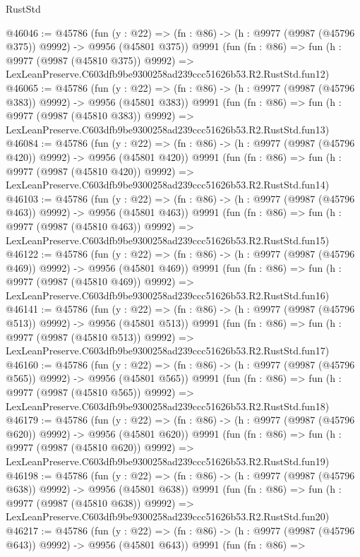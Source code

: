 \begin{lexlean}{RustStd}
\begin{coremodule}
@46046 := @45786
    (fun (y : @22) => (fn : @86) -> (h : @9977 (@9987 (@45796 @375)) @9992) -> @9956 (@45801 @375))
    @9991
    (fun (fn : @86) =>
    fun (h : @9977 (@9987 (@45810 @375)) @9992) =>
    LexLeanPreserve.C603dfb9be9300258ad239ccc51626b53.R2.RustStd.fun12)
@46065 := @45786
    (fun (y : @22) => (fn : @86) -> (h : @9977 (@9987 (@45796 @383)) @9992) -> @9956 (@45801 @383))
    @9991
    (fun (fn : @86) =>
    fun (h : @9977 (@9987 (@45810 @383)) @9992) =>
    LexLeanPreserve.C603dfb9be9300258ad239ccc51626b53.R2.RustStd.fun13)
@46084 := @45786
    (fun (y : @22) => (fn : @86) -> (h : @9977 (@9987 (@45796 @420)) @9992) -> @9956 (@45801 @420))
    @9991
    (fun (fn : @86) =>
    fun (h : @9977 (@9987 (@45810 @420)) @9992) =>
    LexLeanPreserve.C603dfb9be9300258ad239ccc51626b53.R2.RustStd.fun14)
@46103 := @45786
    (fun (y : @22) => (fn : @86) -> (h : @9977 (@9987 (@45796 @463)) @9992) -> @9956 (@45801 @463))
    @9991
    (fun (fn : @86) =>
    fun (h : @9977 (@9987 (@45810 @463)) @9992) =>
    LexLeanPreserve.C603dfb9be9300258ad239ccc51626b53.R2.RustStd.fun15)
@46122 := @45786
    (fun (y : @22) => (fn : @86) -> (h : @9977 (@9987 (@45796 @469)) @9992) -> @9956 (@45801 @469))
    @9991
    (fun (fn : @86) =>
    fun (h : @9977 (@9987 (@45810 @469)) @9992) =>
    LexLeanPreserve.C603dfb9be9300258ad239ccc51626b53.R2.RustStd.fun16)
@46141 := @45786
    (fun (y : @22) => (fn : @86) -> (h : @9977 (@9987 (@45796 @513)) @9992) -> @9956 (@45801 @513))
    @9991
    (fun (fn : @86) =>
    fun (h : @9977 (@9987 (@45810 @513)) @9992) =>
    LexLeanPreserve.C603dfb9be9300258ad239ccc51626b53.R2.RustStd.fun17)
@46160 := @45786
    (fun (y : @22) => (fn : @86) -> (h : @9977 (@9987 (@45796 @565)) @9992) -> @9956 (@45801 @565))
    @9991
    (fun (fn : @86) =>
    fun (h : @9977 (@9987 (@45810 @565)) @9992) =>
    LexLeanPreserve.C603dfb9be9300258ad239ccc51626b53.R2.RustStd.fun18)
@46179 := @45786
    (fun (y : @22) => (fn : @86) -> (h : @9977 (@9987 (@45796 @620)) @9992) -> @9956 (@45801 @620))
    @9991
    (fun (fn : @86) =>
    fun (h : @9977 (@9987 (@45810 @620)) @9992) =>
    LexLeanPreserve.C603dfb9be9300258ad239ccc51626b53.R2.RustStd.fun19)
@46198 := @45786
    (fun (y : @22) => (fn : @86) -> (h : @9977 (@9987 (@45796 @638)) @9992) -> @9956 (@45801 @638))
    @9991
    (fun (fn : @86) =>
    fun (h : @9977 (@9987 (@45810 @638)) @9992) =>
    LexLeanPreserve.C603dfb9be9300258ad239ccc51626b53.R2.RustStd.fun20)
@46217 := @45786
    (fun (y : @22) => (fn : @86) -> (h : @9977 (@9987 (@45796 @643)) @9992) -> @9956 (@45801 @643))
    @9991
    (fun (fn : @86) =>

\end{coremodule}
\end{lexlean}
